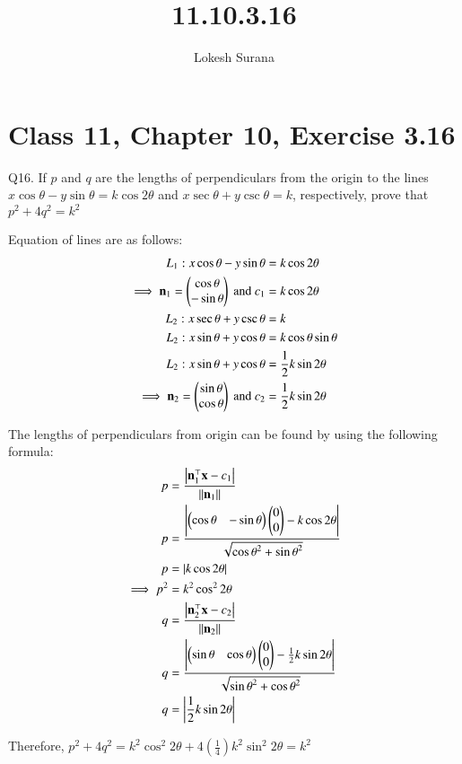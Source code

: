 \documentclass[journal,12pt,twocolumn]{IEEEtran}
\renewcommand{\vec}[1]{\boldsymbol{\mathbf{#1}}}
\begin{document}
\vspace{3cm}
\title{11.10.3.16}
\author{Lokesh Surana}
\maketitle
\section*{Class 11, Chapter 10, Exercise 3.16}

Q16. If ${p}$ and ${q}$ are the lengths of perpendiculars from the origin to the lines ${x}\cos\theta - {y}\sin\theta =  {k}\cos2\theta$ and ${x}\sec\theta + {y}\csc\theta = {k}$, respectively, prove that ${p}^2 + 4{q}^2 = {k}^2$

\solution Equation of lines are as follows:
\begin{align}
    {L}_1: {x}\cos\theta - {y}\sin\theta &=  {k}\cos2\theta \\
    \implies \vec{n}_1 = \myvec{\cos\theta \\ -\sin\theta} \text{ and } {c}_1 &= {k}\cos2\theta\\
    {L}_2: {x}\sec\theta + {y}\csc\theta &= {k} \\
    {L}_2: {x}\sin\theta + {y}\cos\theta &= {k}\cos\theta\sin\theta \\
    {L}_2: {x}\sin\theta + {y}\cos\theta &= \frac{1}{2}{k}\sin2\theta \\
    \implies \vec{n}_2 = \myvec{\sin\theta \\ \cos\theta} \text{ and } {c}_2 &= \frac{1}{2}{k}\sin2\theta
\end{align}

The lengths of perpendiculars from origin can be found by using the following formula:
\begin{align}
    {p} &= \frac{\abs{  \vec{n}_1^{\top}\vec{x}-{c}_1 }}{\norm{\vec{n}_1}} \\
    {p} &= \frac{\abs{ \myvec{\cos\theta & -\sin\theta}\myvec{0\\0} - {k}\cos2\theta}}{\sqrt{{\cos\theta}^2 + {\sin\theta}^2}} \\
    {p} &= \abs{{k}\cos2\theta} \\
    \implies {p}^2 &= {k}^2\cos^2 2\theta\\
    {q} &= \frac{\abs{  \vec{n}_2^{\top}\vec{x}-{c}_2 }}{\norm{\vec{n}_2}} \\
    {q} &= \frac{\abs{ \myvec{\sin\theta & \cos\theta}\myvec{0\\0} - \frac{1}{2}{k}\sin2\theta}}{\sqrt{{\sin\theta}^2 + {\cos\theta}^2}} \\
    {q} &= \abs{ \frac{1}{2}{k}\sin2\theta}\\
\end{align}

Therefore, \newline 
${p}^2 + 4{q}^2 = {k}^2\cos^2 2\theta + 4(\frac{1}{4}){k}^2\sin^2 2\theta = {k}^2$
\end{document}
